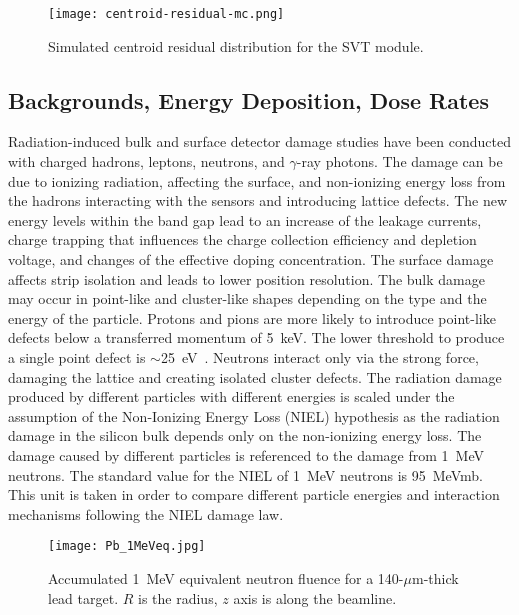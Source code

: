 \begin{figure}[hbt]
\texttt{[image: centroid-residual-mc.png]}
\caption{Simulated centroid residual distribution for the SVT module.}
\label{fig:centroid-residual-mc}
\end{figure}

\subsection{Backgrounds, Energy Deposition, Dose Rates}
\label{sec:simdetails}

Radiation-induced bulk and surface detector damage studies have been conducted with charged hadrons, leptons,
neutrons, and $\gamma$-ray photons. The damage can be due to ionizing radiation, affecting the surface, and
non-ionizing energy loss from the hadrons interacting with the sensors and introducing lattice defects. The new
energy levels within the band gap lead to an increase of the leakage currents, charge trapping that influences
the charge collection efficiency and depletion voltage, and changes of the effective doping concentration. The
surface damage affects strip isolation and leads to lower position resolution. The bulk damage may occur in
point-like and cluster-like shapes depending on the type and the energy of the particle. Protons and pions are more
likely to introduce point-like defects below a transferred momentum of 5~keV. The lower threshold to produce a
single point defect is $\sim$25~eV~\cite{ROHE}. Neutrons interact only via the strong force, damaging the lattice
and creating isolated cluster defects. The radiation damage produced by different particles with different energies
is scaled under the assumption of the Non-Ionizing Energy Loss (NIEL) hypothesis as the radiation damage in the
silicon bulk depends only on the non-ionizing energy loss. The damage caused by different particles is referenced to
the damage from 1~MeV neutrons. The standard value for the NIEL of 1~MeV neutrons is 95~MeVmb. This unit is
taken in order to compare different particle energies and interaction mechanisms following the NIEL damage law.

\begin{figure}[hbt] 
\texttt{[image: Pb\_1MeVeq.jpg]}
\caption{Accumulated 1~MeV equivalent neutron fluence for a 140-$\mu$m-thick lead target. $R$ is the radius,
  $z$ axis is along the beamline.}
\label{fig:fluka1}
\end{figure}

